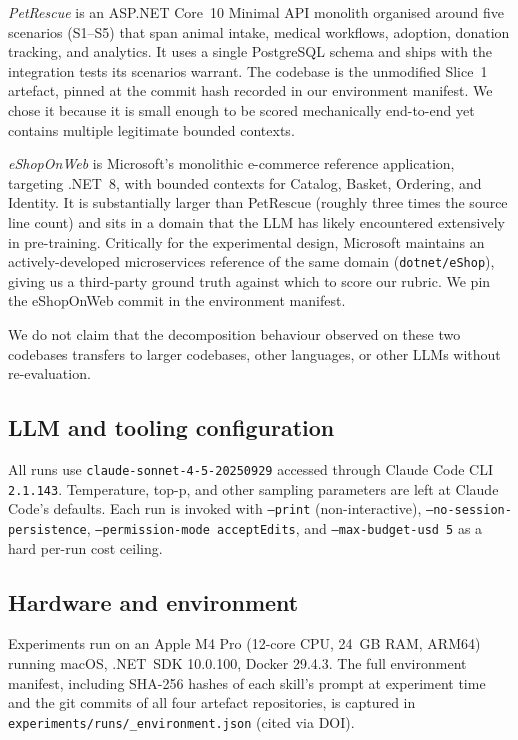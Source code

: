 \documentclass[journal]{IEEEtran}
\begin{document}
\textit{PetRescue} is an ASP.NET Core~10 Minimal API monolith
organised around five scenarios (S1--S5) that span animal intake,
medical workflows, adoption, donation tracking, and analytics. It
uses a single PostgreSQL schema and ships with the integration
tests its scenarios warrant. The codebase is the unmodified Slice~1
artefact, pinned at the commit hash recorded in our environment
manifest. We chose it because it is small enough to be scored
mechanically end-to-end yet contains multiple legitimate bounded
contexts.

\textit{eShopOnWeb} is Microsoft's monolithic e-commerce reference
application, targeting .NET~8, with bounded contexts for Catalog,
Basket, Ordering, and Identity. It is substantially larger than
PetRescue (roughly three times the source line count) and sits in
a domain that the LLM has likely encountered extensively in
pre-training. Critically for the experimental design, Microsoft
maintains an actively-developed microservices reference of the
same domain (\texttt{dotnet/eShop}), giving us a third-party
ground truth against which to score our rubric. We pin the
eShopOnWeb commit in the environment manifest.

We do not claim that the decomposition behaviour observed on these
two codebases transfers to larger codebases, other languages, or
other LLMs without re-evaluation.

\subsection{LLM and tooling configuration}
All runs use \texttt{claude-sonnet-4-5-20250929} accessed through
Claude Code CLI \texttt{2.1.143}. Temperature, top-p, and other sampling
parameters are left at Claude Code's defaults. Each run is invoked
with \texttt{--print} (non-interactive), \texttt{--no-session-persistence},
\texttt{--permission-mode acceptEdits}, and \texttt{--max-budget-usd 5}
as a hard per-run cost ceiling.

\subsection{Hardware and environment}
Experiments run on an Apple M4 Pro (12-core CPU, 24~GB RAM, ARM64)
running macOS, .NET~SDK 10.0.100, Docker 29.4.3. The full environment
manifest, including SHA-256 hashes of each skill's prompt at experiment
time and the git commits of all four artefact repositories, is captured
in \texttt{experiments/runs/\_environment.json} (cited via DOI).
\end{document}
